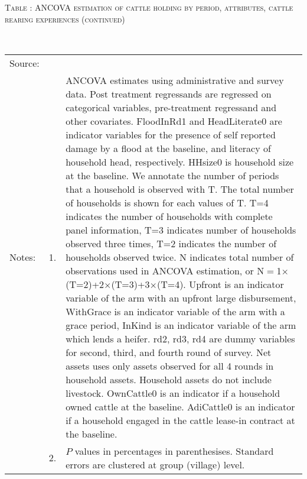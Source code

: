 \addtocounter{table}{-1}
\vspace{0cm}\hspace{-1cm}\begin{minipage}[t]{14cm}
\hfil\textsc{\normalsize Table \thetable: ANCOVA estimation of cattle holding by period, attributes, cattle rearing experiences (continued)\label{tab ANCOVA NumCows Experience attributes timevarying 2}}\\
\setlength{\tabcolsep}{1pt}
\setlength{\baselineskip}{8pt}
\renewcommand{\arraystretch}{.52}
\hfil{}\\
\renewcommand{\arraystretch}{.8}
\setlength{\tabcolsep}{1pt}
\begin{tabular}{>{\hfill\scriptsize}p{1cm}<{}>{\hfill\scriptsize}p{.25cm}<{}>{\scriptsize}p{12cm}<{\hfill}}
Source:& \multicolumn{2}{l}{\scriptsize Estimated with GUK administrative and survey data.}\\
Notes: & 1. & ANCOVA estimates using administrative and survey data. Post treatment regressands are regressed on categorical variables, pre-treatment regressand and other covariates. \textsf{FloodInRd1} and \textsf{HeadLiterate0} are indicator variables for the presence of self reported damage by a flood at the baseline, and literacy of household head, respectively. \textsf{HHsize0} is household size at the baseline. We annotate the number of periods that a household is observed with \textsf{T}. The total number of households is shown for each values of \textsf{T}. \textsf{T=4} indicates the number of households with complete panel information, \textsf{T=3} indicates number of households observed three times, \textsf{T=2} indicates the number of households observed twice. \textsf{N} indicates total number of observations used in ANCOVA estimation, or \textsf{N$=$1$\times$(T=2)+2$\times$(T=3)+3$\times$(T=4)}.  \textsf{Upfront} is an indicator variable of the arm with an upfront large disbursement, \textsf{WithGrace} is an indicator variable of the arm with a grace period, \textsf{InKind} is an indicator variable of the arm which lends a heifer. \textsf{rd2, rd3, rd4} are dummy variables for second, third, and fourth round of survey. Net assets uses only assets observed for all 4 rounds in household assets. Household assets do not include livestock. \textsf{OwnCattle0} is an indicator if a household owned cattle at the baseline. \textsf{AdiCattle0} is an indicator if a household engaged in the cattle lease-in contract at the baseline.  \\
& 2. & $P$ values in percentages in parenthesises. Standard errors are clustered at group (village) level.
\end{tabular}
\end{minipage}



